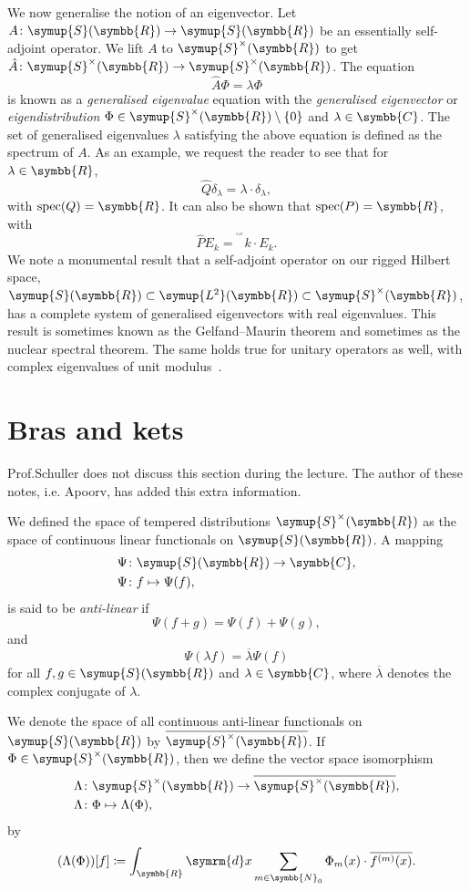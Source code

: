 \documentclass[11pt, a4paper]{article}
\theoremstyle{definition}
\newcommand{\ltwo}{\symup{L^2}}
\newcommand{\position}{Q}
\newcommand{\momentum}{P}
\newcommand{\rr}{\symbb{R}}
\newcommand{\cc}{\symbb{C}}
\newcommand{\nn}{\symbb{N}_0}
\newcommand{\dirac}{\delta}
\newcommand{\ltwor}{\ltwo(\rr)}
\newcommand{\schwartz}{\symup{S}}
\newcommand{\schwartzr}{\schwartz(\rr)}
\newcommand{\dist}{\schwartz^\times}
\newcommand{\distr}{\dist(\rr)}
\newcommand{\anti}{\overline{\distr}}
\renewcommand*{\hbar}{\mathrm{^^^^0127}}
\DeclareMathOperator{\spec}{spec}
\newcommand{\der}{\mathop{}\!\symrm{d}}
\begin{document}
    We now generalise the notion of an eigenvector. Let $A \colon \schwartzr \rightarrow \schwartzr$ be an essentially self-adjoint operator. We lift $A$ to $\distr$ to get $\hat{A} \colon \distr \rightarrow \distr$. The equation
    \[
    \hat{A} \Phi = \lambda \Phi
    \]
    is known as a \textit{generalised eigenvalue} equation with the \textit{generalised eigenvector} or \textit{eigendistribution} $\Phi \in \distr \setminus \{0\}$ and $\lambda \in \cc$. The set of generalised eigenvalues $\lambda$ satisfying the above equation is defined as the spectrum of $A$.
    As an example, we request the reader to see that for $\lambda \in \rr$,
    \[
    \hat{\position}\dirac_\lambda = \lambda \cdot \dirac_\lambda,
    \]
    with $\spec(\position) = \rr$.
    It can also be shown that $\spec(\momentum) = \rr$, with
    \[
    \hat{\momentum}E_k = \hbar k \cdot E_k.
    \]
    We note a monumental result that a self-adjoint operator on our rigged Hilbert space, $\schwartzr \subset \ltwor \subset \distr$, has a complete system of generalised eigenvectors with real eigenvalues. This result is sometimes known as the Gelfand--Maurin theorem and sometimes as the nuclear spectral theorem. The same holds true for unitary operators as well, with complex eigenvalues of unit modulus~\cite{gelfand, spectralthm, gould, Blanchard}.

    \section{Bras and kets}

    Prof.\@ Schuller does not discuss this section during the lecture. The author of these notes, i.e. Apoorv, has added this extra information.

    We defined the space of tempered distributions $\distr$ as the space of continuous linear functionals on $\schwartzr$. A mapping
    \begin{align*}
        \Psi &\colon \schwartzr \rightarrow \cc,\\
        \Psi &\colon f \mapsto \Psi(f),
    \end{align*}
    is said to be \textit{anti-linear} if
    \[
    \Psi(f + g) = \Psi(f) + \Psi(g),
    \]
    and
    \[
    \Psi(\lambda f) = \overline{\lambda}\Psi(f)
    \]
    for all $f, g \in \schwartzr$ and $\lambda \in \cc$, where $\overline{\lambda}$ denotes the complex conjugate of $\lambda$.

    We denote the space of all continuous anti-linear functionals on $\schwartzr$ by $\anti$. If $\Phi \in \distr$, then we define the vector space isomorphism
    \begin{align*}
        \Lambda &\colon \distr \rightarrow \anti,\\
        \Lambda &\colon \Phi \mapsto \Lambda(\Phi),
    \end{align*}
    by
    \begin{align*}
        (\Lambda(\Phi))[f] \coloneq \int_{\rr} \der x \sum_{m \in \nn} \Phi_m (x) \cdot \overline{f^{(m)} (x)}.
    \end{align*}
\end{document}
